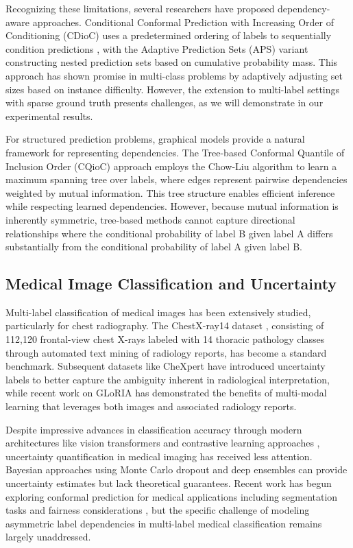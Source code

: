 Recognizing these limitations, several researchers have proposed dependency-aware approaches.
Conditional Conformal Prediction with Increasing Order of Conditioning (CDioC) uses a predetermined ordering of labels to sequentially condition predictions \citep{stutz2021learning}, with the Adaptive Prediction Sets (APS) variant \citep{romano2020classification} constructing nested prediction sets based on cumulative probability mass.
This approach has shown promise in multi-class problems by adaptively adjusting set sizes based on instance difficulty.
However, the extension to multi-label settings with sparse ground truth presents challenges, as we will demonstrate in our experimental results.

For structured prediction problems, graphical models provide a natural framework for representing dependencies.
The Tree-based Conformal Quantile of Inclusion Order (CQioC) approach \citep{fontana2023prediction} employs the Chow-Liu algorithm to learn a maximum spanning tree over labels, where edges represent pairwise dependencies weighted by mutual information.
This tree structure enables efficient inference while respecting learned dependencies.
However, because mutual information is inherently symmetric, tree-based methods cannot capture directional relationships where the conditional probability of label B given label A differs substantially from the conditional probability of label A given label B\@.

\subsection{Medical Image Classification and Uncertainty}
\label{subsec:medical-image-classification-and-uncertainty}

Multi-label classification of medical images has been extensively studied, particularly for chest radiography.
The ChestX-ray14 dataset \citep{wang2017chestxray8}, consisting of 112,120 frontal-view chest X-rays labeled with 14 thoracic pathology classes through automated text mining of radiology reports, has become a standard benchmark.
Subsequent datasets like CheXpert \citep{irvin2019chexpert} have introduced uncertainty labels to better capture the ambiguity inherent in radiological interpretation, while recent work on GLoRIA \citep{huang2020gloria} has demonstrated the benefits of multi-modal learning that leverages both images and associated radiology reports.

Despite impressive advances in classification accuracy through modern architectures like vision transformers \citep{dosovitskiy2020image} and contrastive learning approaches \citep{chen2020simple}, uncertainty quantification in medical imaging has received less attention.
Bayesian approaches using Monte Carlo dropout \citep{gal2016dropout} and deep ensembles \citep{lakshminarayanan2017simple} can provide uncertainty estimates but lack theoretical guarantees.
Recent work has begun exploring conformal prediction for medical applications including segmentation tasks \citep{angelopoulos2022image} and fairness considerations \citep{lu2022improved}, but the specific challenge of modeling asymmetric label dependencies in multi-label medical classification remains largely unaddressed.

